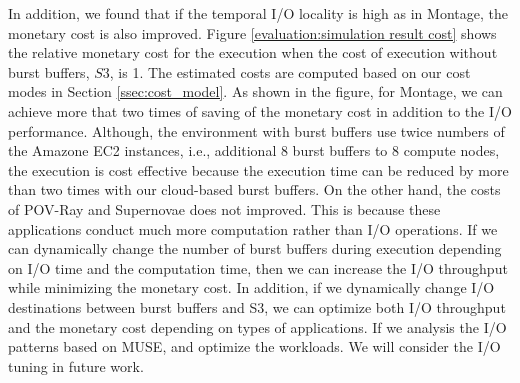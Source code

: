 In addition, we found that if the temporal I/O locality is high as in Montage,
the monetary cost is also improved.
Figure \ref{evaluation:simulation result cost} shows the relative monetary cost
for the execution when the cost of execution without burst buffers, $S3$, is 1.
The estimated costs are computed based on our cost modes in Section
\ref{ssec:cost_model}. As shown in the figure, for Montage, 
we can achieve more that two times of saving of the monetary cost in addition to
the I/O performance. Although, the environment with burst buffers use twice
numbers of the Amazone EC2 instances, i.e., additional 8 burst buffers to 8
compute nodes, the execution is cost effective because the execution time can be
reduced by more than two times with our cloud-based burst buffers.
On the other hand, the costs of POV-Ray and Supernovae does not improved. 
This is because these applications conduct much more computation rather than I/O
operations.
If we can dynamically change the number of burst buffers during execution
depending on I/O time and the computation time, then we
can increase the I/O throughput while minimizing the monetary cost. In addition, if we dynamically
change I/O destinations between burst buffers and S3, we can optimize both I/O
throughput and the monetary cost depending on types of applications.
If we analysis the I/O patterns based on MUSE, and optimize the workloads. We
will consider the I/O tuning in future work.

% 
% 
% 


